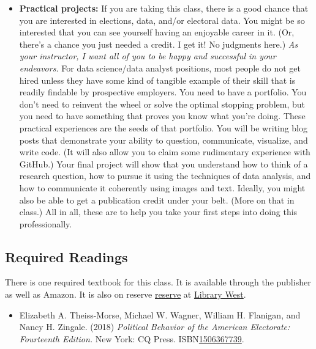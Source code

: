 \documentclass[11pt]{article}
\begin{document}
\begin{itemize}
\item \textbf{Practical projects:} If you are taking this class, there is a good chance that you are interested in elections, data, and/or electoral data. You might be so interested that you can see yourself having an enjoyable career in it. (Or, there's a chance you just needed a credit. I get it! No judgments here.) \textit{As your instructor, I want all of you to be happy and successful in your endeavors.} For data science/data analyst positions, most people do not get hired unless they have some kind of tangible example of their skill that is readily findable by prospective employers. You need to have a portfolio. You don't need to reinvent the wheel or solve the optimal stopping problem, but you need to have something that proves you know what you're doing. These practical experiences are the seeds of that portfolio. You will be writing blog posts that demonstrate your ability to question, communicate, visualize, and write code. (It will also allow you to claim some rudimentary experience with GitHub.) Your final project will show that you understand how to think of a research question, how to pursue it using the techniques of data analysis, and how to communicate it coherently using images and text. Ideally, you might also be able to get a publication credit under your belt. (More on that in class.) All in all, these are to help you take your first steps into doing this professionally. 
\end{itemize}

\subsection{Required Readings}
There is one required textbook for this class. It is available through the publisher as well as Amazon. It is also on reserve {\href{https://cms.uflib.ufl.edu/accesssupport/howtostudents}{reserve}} at {\href{https://cms.uflib.ufl.edu}{Library West}}.

\begin{itemize}
\item Elizabeth A. Theiss-Morse, Michael W. Wagner, William H. Flanigan, and Nancy H. Zingale. (2018) \textit{Political Behavior of the American Electorate: Fourteenth Edition.} New York: CQ Press. ISBN{\href{https://www.amazon.com/Political-Behavior-Electorate-Elizabeth-Theiss-Morse/dp/1506367739}{1506367739}}.
\end{itemize}
\end{document}
